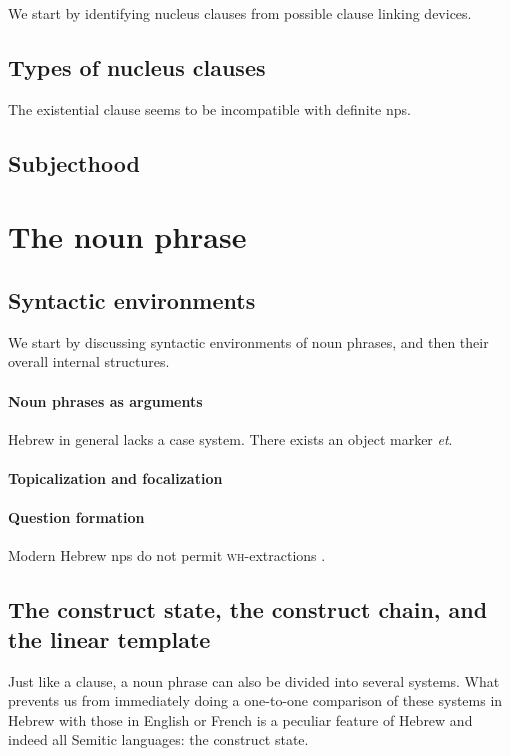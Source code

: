 \documentclass[a4paper, oneside, 12pt]{report}
\newcommand{\form}[1]{\emph{#1}}
\newcommand{\category}[1]{\textsc{#1}}
\begin{document}
We start by identifying nucleus clauses from possible clause linking devices.


\subsection{Types of nucleus clauses}

The existential clause seems to be incompatible with definite \acp{np}.

\subsection{Subjecthood}


\section{The noun phrase}

\subsection{Syntactic environments}

We start by discussing syntactic environments of noun phrases,
and then their overall internal structures.

\paragraph*{Noun phrases as arguments}
Hebrew in general lacks a case system.
There exists an object marker \form{et}.

\paragraph*{Topicalization and focalization}

\paragraph*{Question formation}
Modern Hebrew \acp{np} do not permit \category{wh}-extractions
\citep{shlonsky2012some}.

\subsection{The construct state, the construct chain, and the linear template}

Just like a clause, a noun phrase can also be divided into several systems.
What prevents us from immediately doing a one-to-one comparison of these systems in Hebrew
with those in English or French 
is a peculiar feature of Hebrew and indeed all Semitic languages:
the construct state.
\end{document}

